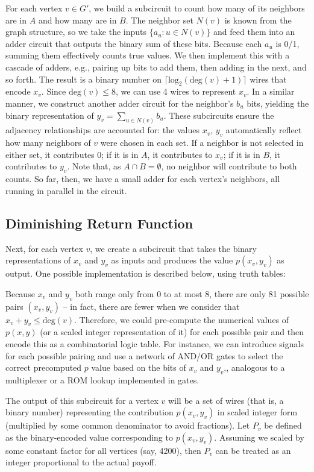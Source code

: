 \documentclass{article}
\begin{document}
For each vertex $v \in G'$, we build a subcircuit to count how many of its neighbors are in $A$ and how many are in $B$. The neighbor set $N(v)$ is known from the graph structure, so we take the inputs $\{ a_u : u \in N(v)\}$ and feed them into an adder circuit that outputs the binary sum of these bits. Because each $a_u$ is 0/1, summing them effectively counts true values. We then implement this with a cascade of adders, e.g., pairing up bits to add them, then adding in the next, and so forth. The result is a binary number on $\lceil \text{log}_2(\text{deg}(v)+1)\rceil$ wires that encode $x_v$. Since $\text{deg}(v) \leq 8$, we can use 4 wires to represent $x_v$. In a similar manner, we construct another adder circuit for the neighbor's $b_u$ bits, yielding the binary representation of $y_v = \sum_{u \in N(v)}b_u$. These subcircuits ensure the adjacency relationships are accounted for: the values $x_v$, $y_v$ automatically reflect how many neighbors of $v$ were chosen in each set. If a neighbor is not selected in either set, it contributes 0; if it is in $A$, it contributes to $x_v$; if it is in $B$, it contributes to $y_v$. Note that, as $A \cap B = \emptyset$, no neighbor will contribute to both counts. So far, then, we have a small adder for each vertex's neighbors, all running in parallel in the circuit.

\subsection{Diminishing Return Function}

Next, for each vertex $v$, we create a subcircuit that takes the binary representations of $x_v$ and $y_v$ as inputs and produces the value $p(x_v, y_v)$ as output. One possible implementation is described below, using truth tables:

Because $x_v$ and $y_v$ both range only from 0 to at most 8, there are only 81 possible pairs $(x_v, y_v)$ -- in fact, there are fewer when we consider that $x_v + y_v \leq \text{deg}(v)$. Therefore, we could pre-compute the numerical values of $p(x,y)$ (or a scaled integer representation of it) for each possible pair and then encode this as a combinatorial logic table. For instance, we can introduce signals for each possible pairing and use a network of AND/OR gates to select the correct precomputed $p$ value based on the bits of $x_v$ and $y_v$,, analogous to a multiplexer or a ROM lookup implemented in gates.

The output of this subcircuit for a vertex $v$ will be a set of wires (that is, a binary number) representing the contribution $p(x_v, y_v)$ in scaled integer form (multiplied by some common denominator to avoid fractions). Let $P_v$ be defined as the binary-encoded value corresponding to $p(x_v, y_v)$. Assuming we scaled by some constant factor for all vertices (say, 4200), then $P_v$ can be treated as an integer proportional to the actual payoff.
\end{document}
